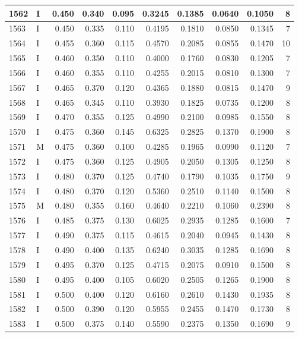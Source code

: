 \documentclass[9pt,twocolumn,twoside,]{pnas-new}
\begin{document}
\begin{tabular}{l|l|r|r|r|r|r|r|r|r}
\hline
1562 & I & 0.450 & 0.340 & 0.095 & 0.3245 & 0.1385 & 0.0640 & 0.1050 & 8\\
\hline
1563 & I & 0.450 & 0.335 & 0.110 & 0.4195 & 0.1810 & 0.0850 & 0.1345 & 7\\
\hline
1564 & I & 0.455 & 0.360 & 0.115 & 0.4570 & 0.2085 & 0.0855 & 0.1470 & 10\\
\hline
1565 & I & 0.460 & 0.350 & 0.110 & 0.4000 & 0.1760 & 0.0830 & 0.1205 & 7\\
\hline
1566 & I & 0.460 & 0.355 & 0.110 & 0.4255 & 0.2015 & 0.0810 & 0.1300 & 7\\
\hline
1567 & I & 0.465 & 0.370 & 0.120 & 0.4365 & 0.1880 & 0.0815 & 0.1470 & 9\\
\hline
1568 & I & 0.465 & 0.345 & 0.110 & 0.3930 & 0.1825 & 0.0735 & 0.1200 & 8\\
\hline
1569 & I & 0.470 & 0.355 & 0.125 & 0.4990 & 0.2100 & 0.0985 & 0.1550 & 8\\
\hline
1570 & I & 0.475 & 0.360 & 0.145 & 0.6325 & 0.2825 & 0.1370 & 0.1900 & 8\\
\hline
1571 & M & 0.475 & 0.360 & 0.100 & 0.4285 & 0.1965 & 0.0990 & 0.1120 & 7\\
\hline
1572 & I & 0.475 & 0.360 & 0.125 & 0.4905 & 0.2050 & 0.1305 & 0.1250 & 8\\
\hline
1573 & I & 0.480 & 0.370 & 0.125 & 0.4740 & 0.1790 & 0.1035 & 0.1750 & 9\\
\hline
1574 & I & 0.480 & 0.370 & 0.120 & 0.5360 & 0.2510 & 0.1140 & 0.1500 & 8\\
\hline
1575 & M & 0.480 & 0.355 & 0.160 & 0.4640 & 0.2210 & 0.1060 & 0.2390 & 8\\
\hline
1576 & I & 0.485 & 0.375 & 0.130 & 0.6025 & 0.2935 & 0.1285 & 0.1600 & 7\\
\hline
1577 & I & 0.490 & 0.375 & 0.115 & 0.4615 & 0.2040 & 0.0945 & 0.1430 & 8\\
\hline
1578 & I & 0.490 & 0.400 & 0.135 & 0.6240 & 0.3035 & 0.1285 & 0.1690 & 8\\
\hline
1579 & I & 0.495 & 0.370 & 0.125 & 0.4715 & 0.2075 & 0.0910 & 0.1500 & 8\\
\hline
1580 & I & 0.495 & 0.400 & 0.105 & 0.6020 & 0.2505 & 0.1265 & 0.1900 & 8\\
\hline
1581 & I & 0.500 & 0.400 & 0.120 & 0.6160 & 0.2610 & 0.1430 & 0.1935 & 8\\
\hline
1582 & I & 0.500 & 0.390 & 0.120 & 0.5955 & 0.2455 & 0.1470 & 0.1730 & 8\\
\hline
1583 & I & 0.500 & 0.375 & 0.140 & 0.5590 & 0.2375 & 0.1350 & 0.1690 & 9\\

\end{tabular}
\end{document}
